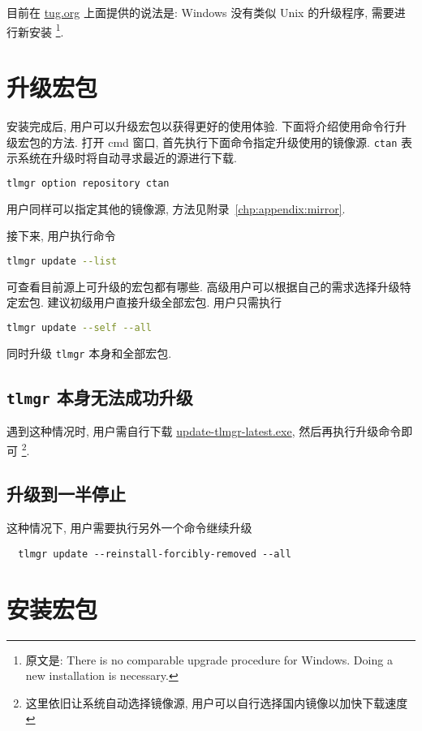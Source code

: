 目前在 \href{https://www.tug.org/texlive/upgrade.html}{tug.org}
上面提供的说法是:
Windows 没有类似 Unix 的升级程序,
需要进行新安装%
\footnote{原文是: There is no comparable upgrade procedure for Windows.
Doing a new installation is necessary.}.

\section{升级宏包}\label{sec:windows:update}

安装完成后, 用户可以升级宏包以获得更好的使用体验. 
下面将介绍使用命令行升级宏包的方法. 
打开 \textsf{cmd} 窗口, 首先执行下面命令指定升级使用的镜像源. 
\texttt{ctan} 表示系统在升级时将自动寻求最近的源进行下载. 
\begin{lstlisting}[language=bash]
  tlmgr option repository ctan
\end{lstlisting}
用户同样可以指定其他的镜像源,
方法见附录~\ref{chp:appendix:mirror}.

接下来, 用户执行命令
\begin{lstlisting}[language=bash]
  tlmgr update --list
\end{lstlisting}
可查看目前源上可升级的宏包都有哪些. 
高级用户可以根据自己的需求选择升级特定宏包.
建议初级用户直接升级全部宏包. 
用户只需执行
\begin{lstlisting}[language=bash]
  tlmgr update --self --all
\end{lstlisting}
同时升级 \texttt{tlmgr} 本身和全部宏包. 

\subsection{\texttt{tlmgr} 本身无法成功升级}

遇到这种情况时, 用户需自行下载
\href{https://mirrors.ctan.org/systems/texlive/tlnet/update-tlmgr-latest.exe}{update-tlmgr-latest.exe},
然后再执行升级命令即可%
\footnote{这里依旧让系统自动选择镜像源,
用户可以自行选择国内镜像以加快下载速度}. 

\subsection{升级到一半停止}

这种情况下, 用户需要执行另外一个命令继续升级
\begin{lstlisting}
  tlmgr update --reinstall-forcibly-removed --all
\end{lstlisting}

\section{安装宏包}

